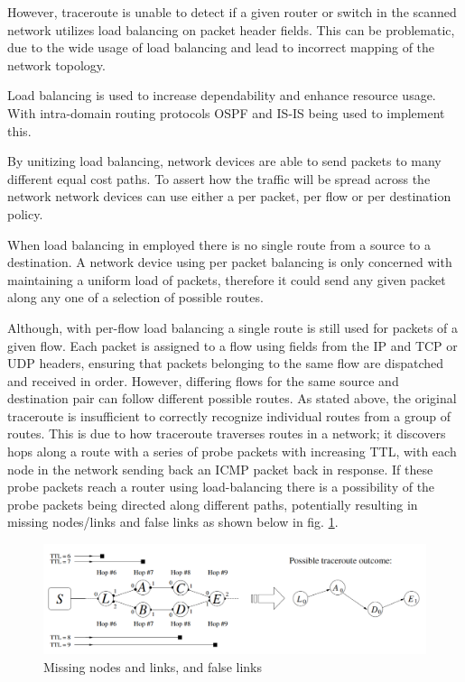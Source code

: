 However, traceroute is unable to detect if a given router or switch in the scanned network utilizes load balancing on packet header fields. This can be problematic, due to the wide usage of load balancing and lead to incorrect mapping of the network topology.\cite{anomalies}\cite{exhaustive}

Load balancing is used to increase dependability and enhance resource usage. With intra-domain routing protocols OSPF\cite{moyospf} and IS-IS\cite{isis} being used to implement this. 

By unitizing load balancing, network devices are able to send packets to many different equal cost paths. To assert how the traffic will be spread across the network network devices can use either a per packet, per flow or per destination policy. \cite{cisco}\cite{juniper} 

When load balancing in employed there is no single route from a source to a destination. A network device using per packet balancing is only concerned with maintaining a uniform load of packets, therefore it could send any given packet along any one of a selection of possible routes.\cite{anomalies}

Although, with per-flow load balancing a single route is still used for packets of a given flow. Each packet is assigned to a flow using fields from the IP and TCP or UDP headers, ensuring that packets belonging to the same flow are dispatched and received in order. However, differing flows for the same source and destination pair can follow different possible routes.\cite{anomalies} 
As stated above, the original traceroute is insufficient to correctly recognize individual routes from a group of routes. This is due to how traceroute traverses routes in a network; it discovers hops along a route with a series of probe packets with increasing TTL, with each node in the network sending back an ICMP packet back in response. If these probe packets reach a router using load-balancing there is a possibility of the probe packets being directed along different paths, potentially resulting in missing nodes/links and false links as shown below in fig. \ref{figure:missing_node_fig}.

\begin{figure}[!ht]
  \begin{center}
    \includegraphics[scale=0.3]{images/missing_nodes.png}
    \caption{Missing nodes and links, and false links \cite{anomalies}}
    \label{figure:missing_node_fig}
  \end{center}
\end{figure}

